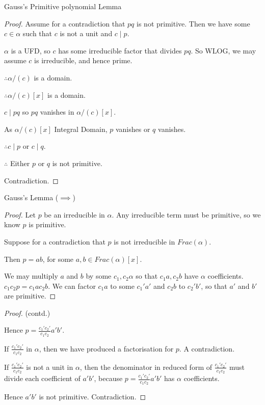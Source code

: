 \documentclass{beamer}
\begin{document}
\begin{frame}{Gauss's Primitive polynomial Lemma}
  \begin{proof}
    Assume for a contradiction that $pq$ is not primitive. 
    Then we have some $c \in \alpha$ such that $c$ is not a unit and $c \mid p$. 
   
    $\alpha$ is a UFD, so $c$ has some irreducible factor that divides $pq$. So WLOG, we may assume $c$ is irreducible, and hence prime.

    $\therefore \alpha/(c)$ is a domain.
    
    $\therefore \alpha/(c) [x]$ is a domain. 

    $c \mid pq$ so $pq$ vanishes in $\alpha/(c) [x]$. 

    As $\alpha/(c) [x]$ Integral Domain, $p$ vanishes or $q$ vanishes.

   $\therefore c \mid p$ or $c \mid q$. 
    
   $\therefore$ Either $p$ or $q$ is not primitive. 

   Contradiction.
  \end{proof}

\end{frame}

\begin{frame}{Gauss's Lemma {($\implies$)}}

  \begin{proof}

    Let $p$ be an irreducible in $\alpha$. Any irreducible term must be primitive, so we know $p$ is primitive. 

    Suppose for a contradiction that $p$ is not irreducible in $Frac (\alpha)$. 

    Then $p = ab$, for some $a,b \in Frac (\alpha)[x]$. 

    We may multiply $a$ and $b$ by some $c_1,c_2 \alpha$ so that $c_1a,c_2b$ have $\alpha$ coefficients. $c_1c_2p = c_1ac_2b$. 
    We can factor $c_1a$ to some $c_1'a'$ and $c_2b$ to $c_2'b'$, so that $a'$ and $b'$ are primitive. 


  \end{proof}
  
\end{frame}

\begin{frame}
  \begin{proof} (contd.)
    
    Hence $p = \frac{c_1'c_2'}{c_1c_2}a'b'$.

    If $\frac{c_1'c_2'}{c_1c_2}$ in $\alpha$, then we have produced a factorisation for $p$. A contradiction. 

    If $\frac{c_1'c_2'}{c_1c_2}$ is not a unit in $\alpha$, then the denominator in reduced form of $\frac{c_1'c_2'}{c_1c_2}$ must divide each coefficient of $a'b'$, because $p =  \frac{c_1'c_2'}{c_1c_2}a'b'$ has $\alpha$ coefficients. 
  
    Hence $a'b'$ is not primitive. Contradiction.

  \end{proof}
  
\end{frame}
\end{document}
